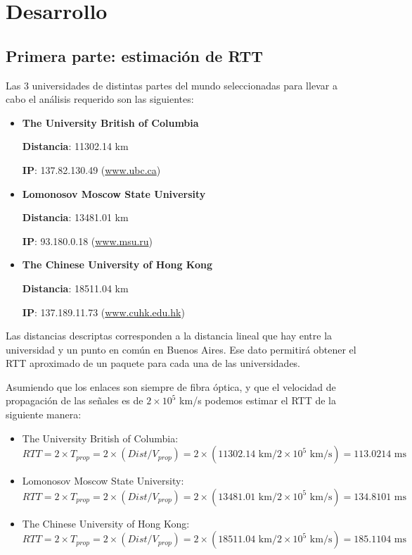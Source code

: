 \section{Desarrollo}
\subsection{Primera parte: estimación de RTT}
Las 3 universidades de distintas partes del mundo seleccionadas para llevar a cabo el análisis requerido son las siguientes: 

\begin{itemize}
 \item {\bf The University British of Columbia}
 
	{\bf Distancia}: 11302.14 km 
	
	{\bf IP}: 137.82.130.49 (\url{www.ubc.ca}{})
 
 \item {\bf Lomonosov Moscow State University}

	{\bf Distancia}: 13481.01 km
	
	{\bf IP}: 93.180.0.18 (\url{www.msu.ru}{})
 
 \item {\bf The Chinese University of Hong Kong}

	{\bf Distancia}: 18511.04 km
	
	{\bf IP}: 137.189.11.73 (\url{www.cuhk.edu.hk})
 
\end{itemize}

Las distancias descriptas corresponden a la distancia lineal que hay entre la universidad y un punto en común en Buenos Aires. Ese dato permitirá obtener el RTT aproximado de un paquete para cada una de las universidades. 

Asumiendo que los enlaces son siempre de fibra óptica, y que el velocidad de propagación de las señales es de $2 \times 10^{5}$ km/s podemos estimar el RTT de la siguiente manera: 

\begin{itemize}
 \item The University British of Columbia: 
\begin{equation}
 	RTT = 2 \times T_{prop} = 2 \times (Dist / V_{prop}) = 2 \times (11302.14 \text{ km} / 2\times10^5 \text{ km/s}) = 113.0214 \text{ ms}
\end{equation}
 
 \item Lomonosov Moscow State University: 
 \begin{equation}
 	RTT = 2 \times T_{prop} = 2 \times (Dist / V_{prop}) = 2 \times (13481.01 \text{ km} / 2\times10^5 \text{ km/s}) = 134.8101  \text{ ms}
 \end{equation}
 
 \item The Chinese University of Hong Kong: 
 \begin{equation}
 	RTT = 2 \times T_{prop} = 2 \times (Dist / V_{prop}) = 2 \times(18511.04 \text{ km} / 2\times10^5 \text{ km/s}) = 185.1104  \text{ ms}
 \end{equation}

\end{itemize}


